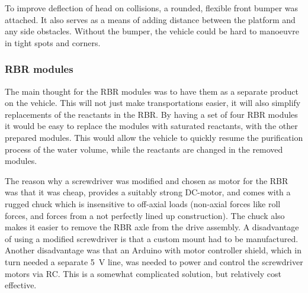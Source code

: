 To improve deflection of head on collisions, a rounded, flexible front bumper was attached. It also serves as a means of adding distance between the platform and any side obstacles. Without the bumper, the vehicle could be hard to manoeuvre in tight spots and corners. 

\subsubsection{RBR modules}

The main thought for the RBR modules was to have them as a separate product on the vehicle. This will not just make transportations easier, it will also simplify replacements of the reactants in the RBR. By having a set of four RBR modules it would be easy to replace the modules with saturated reactants, with the other prepared modules. This would allow the vehicle to quickly resume the purification process of the water volume, while the reactants are changed in the removed modules. %

The reason why a screwdriver was modified and chosen as motor for the RBR was that it was cheap, provides a suitably strong DC-motor, and comes with a rugged chuck which is insensitive to off-axial loads (non-axial forces like roll forces, and forces from a not perfectly lined up construction). The chuck also makes it easier to remove the RBR axle from the drive assembly. A disadvantage of using a modified screwdriver is that a custom mount had to be manufactured. Another disadvantage was that an Arduino with motor controller shield, which in turn needed a separate 5~V line, was needed to power and control the screwdriver motors via RC. This is a somewhat complicated solution, but relatively cost effective.





